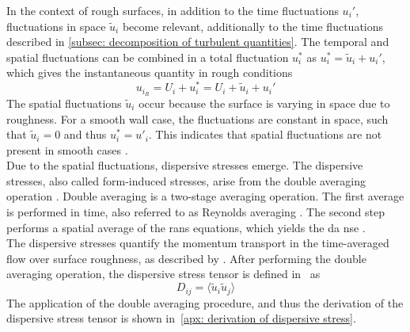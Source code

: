In the context of rough surfaces, in addition to the time fluctuations $u_i'$, fluctuations in space $\tilde{u}_i$ become relevant, additionally to the time fluctuations described in \autoref{subsec: decomposition of turbulent quantities}.
The temporal and spatial fluctuations can be combined in a total fluctuation $u_i^*$ as $u_i^* = \tilde{u}_i + u_i'$, which gives the instantaneous quantity in rough conditions
\begin{equation}
    u_{i_R} = U_i + u_i^* = U_i + \tilde{u}_i + u_i' 
\end{equation}
The spatial fluctuations $\tilde{u}_i$ occur because the surface is varying in space due to roughness.
For a smooth wall case, the fluctuations are constant in space, such that $\tilde{u}_i = 0$ and thus $u^*_i = u'_i$.
This indicates that spatial fluctuations are not present in smooth cases \citep{chanSecondaryMotionTurbulent2018}.\\
Due to the spatial fluctuations, dispersive stresses emerge.
The dispersive stresses, also called form-induced stresses, arise from the double averaging operation \citep{busseReynoldsnumberDependenceNearwall2017}.
Double averaging is a two-stage averaging operation.
The first average is performed in time, also referred to as Reynolds averaging \citep{raupachAveragingProceduresFlow1982}.
The second step performs a spatial average of the \acrshort{rans} equations, which yields the \acrfull{da} \acrlong{nse} \citep{busseReynoldsnumberDependenceNearwall2017}.\\
The dispersive stresses quantify the momentum transport in the time-averaged flow over surface roughness, as described by \cite{manesSignificanceForminducedStress2008}.
After performing the double averaging operation, the dispersive stress tensor is defined in~\cite{busseReynoldsnumberDependenceNearwall2017} as
\begin{equation}\label{eq: dispersive stress tensor}
    D_{ij} = \langle \tilde{u}_i \tilde{u}_j \rangle
\end{equation}
The application of the double averaging procedure, and thus the derivation of the dispersive stress tensor is shown in~\autoref{apx: derivation of dispersive stress}.




